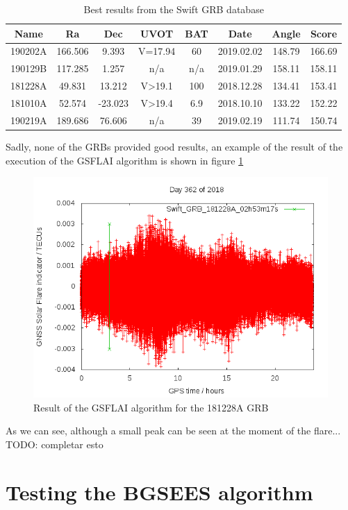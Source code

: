 \begin{table}[h!]
	\centering
	\def\arraystretch{1.2}
	\begin{tabular}{|c c c c c c c c|} 
		\hline
		Name & Ra & Dec & UVOT & BAT & Date & Angle & Score \\
		\hline\hline
		190202A & 166.506 & 9.393 & V=17.94 & 60 & 2019.02.02 & 148.79 & 166.69 \\
		\hline
		190129B & 117.285 & 1.257 & n/a & n/a & 2019.01.29 & 158.11 & 158.11 \\
		\hline
		181228A & 49.831 & 13.212 & V>19.1 & 100 & 2018.12.28 & 134.41 & 153.41 \\
		\hline
		181010A & 52.574 & -23.023 & V>19.4 & 6.9 & 2018.10.10 & 133.22 & 152.22 \\
		\hline
		190219A & 189.686 & 76.606 & n/a & 39 & 2019.02.19 & 111.74 & 150.74 \\
		\hline
	\end{tabular}
	\caption{Best results from the Swift GRB database}
\end{table}

Sadly, none of the GRBs provided good results, an example of the result of the execution of the GSFLAI algorithm is shown in figure \ref{fig:gsflai}

\begin{figure}[!htb]
	\begin{centering}
		\includegraphics[width=0.5\linewidth]{images/swift/gsflai.png}
		\caption{Result of the GSFLAI algorithm for the 181228A GRB}
		\label{fig:gsflai}
	\end{centering}
\end{figure}

As we can see, although a small peak can be seen at the moment of the flare...
TODO: completar esto

\section{Testing the BGSEES algorithm}

